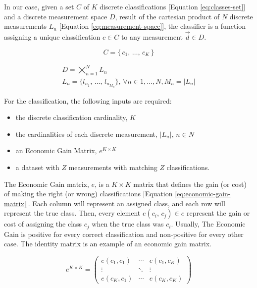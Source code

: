 \documentclass[letterpaper, conference]{IEEEtran}
\begin{document}
In our case, given a set $C$ of $K$ discrete classifications [Equation \ref{eq:classes-set}] and a discrete measurement space $D$, result of the cartesian product of $N$ discrete measurements $L_n$ [Equation \ref{eq:measurement-space}], the classifier is a function assigning a unique classification $c \in C$ to any measurement $\vec{d} \in D$.

\begin{equation}\label{eq:classes-set}
C = \{\,c_1,\, \dots,\, c_{K}\,\}
\end{equation}


\begin{gather}\label{eq:measurement-space}
D = \bigtimes_{n=1}^{N} L_n \\
L_n = \{l_{n_1},\, \dots,\, l_{n_{M_n}}\},\, \forall n \in { 1, ..., N }, M_n = \vert L_n\vert
\end{gather}

For the classification, the following inputs are required:

\begin{itemize}
  \item the discrete classification cardinality, $K$
  \item the cardinalities of each discrete measurement, $\vert L_n \vert,\, n \in N$
  \item an Economic Gain Matrix, $e^{K \times K}$
  \item a dataset with $Z$ measurements with matching $Z$ classifications. 
\end{itemize}

The Economic Gain matrix, $e$, is a $K \times K$ matrix that defines the gain (or cost) of making the right (or wrong) classifications [Equation \ref{eq:economic-gain-matrix}]. Each column will represent an assigned class, and each row will represent the true class. Then, every element $e(c_i,\, c_j) \in e$ represent the gain or cost of assigning the class $c_j$ when the true class was $c_i$. Usually, The Economic Gain is positive for every correct classification and non-positive for every other case. The identity matrix is an example of an economic gain matrix.

\begin{equation}\label{eq:economic-gain-matrix}
  e^{K \times K} = \begin{pmatrix}
    e(c_1,c_1) & \cdots & e(c_1,c_K) \\
      \vdots   & \ddots &    \vdots   \\
    e(c_K,c_1) & \cdots & e(c_K,c_K)
  \end{pmatrix}
\end{equation}
\end{document}
